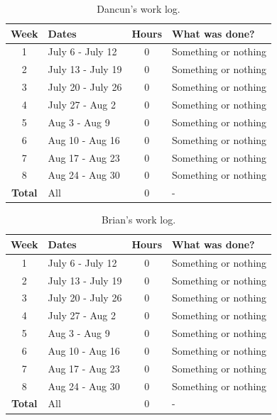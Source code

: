 \begin{table}[!htbp]
\footnotesize{
\begin{tabular}{c|p{}|c|p{}}
\textbf{Week} & \textbf{Dates} & \textbf{Hours} & \textbf{What was done?} \\
\hline 1 & July 6 - July 12     & 0 & Something or nothing \\
\hline 2 & July 13 - July 19    & 0 & Something or nothing \\
\hline 3 & July 20 - July 26    & 0 & Something or nothing \\
\hline 4 & July 27 - Aug 2      & 0 & Something or nothing \\
\hline 5 & Aug 3 - Aug 9        & 0 & Something or nothing \\
\hline 6 & Aug 10 - Aug 16      & 0 & Something or nothing \\
\hline 7 & Aug 17 - Aug 23      & 0 & Something or nothing \\
\hline 8 & Aug 24 - Aug 30      & 0 & Something or nothing \\
\hline\hline\textbf{Total}&All  & 0 & - \\
\end{tabular}
}
\caption{Dancun's work log. }
\label{table:worklog-dancun}
\end{table}

\begin{table}[!htbp]
\footnotesize{
\begin{tabular}{c|p{}|c|p{}}
\textbf{Week} & \textbf{Dates} & \textbf{Hours} & \textbf{What was done?} \\
\hline 1 & July 6 - July 12     & 0 & Something or nothing \\
\hline 2 & July 13 - July 19    & 0 & Something or nothing \\
\hline 3 & July 20 - July 26    & 0 & Something or nothing \\
\hline 4 & July 27 - Aug 2      & 0 & Something or nothing \\
\hline 5 & Aug 3 - Aug 9        & 0 & Something or nothing \\
\hline 6 & Aug 10 - Aug 16      & 0 & Something or nothing \\
\hline 7 & Aug 17 - Aug 23      & 0 & Something or nothing \\
\hline 8 & Aug 24 - Aug 30      & 0 & Something or nothing \\
\hline\hline\textbf{Total}&All  & 0 & - \\
\end{tabular}
}
\caption{Brian's work log. }
\label{table:worklog-brian}
\end{table}


